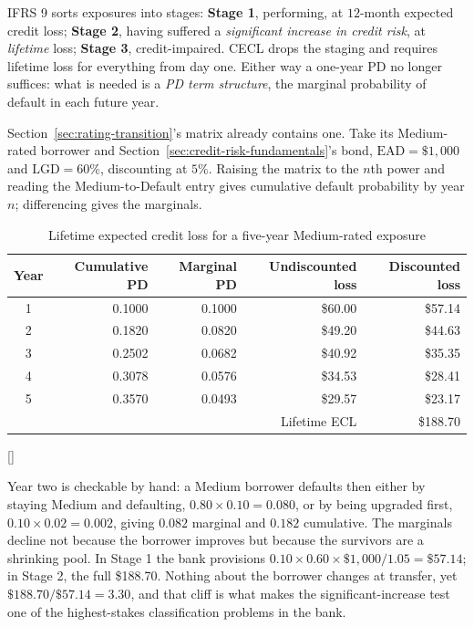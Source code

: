 \documentclass[../ai_in_finance]{subfiles}
\begin{document}
IFRS 9 sorts exposures into stages: \textbf{Stage 1}, performing, at $12$-month expected credit loss; \textbf{Stage 2}, having suffered a \emph{significant increase in credit risk}, at \emph{lifetime} loss; \textbf{Stage 3}, credit-impaired. CECL drops the staging and requires lifetime loss for everything from day one. Either way a one-year PD no longer suffices: what is needed is a \emph{PD term structure}, the marginal probability of default in each future year.

Section~\ref{sec:rating-transition}'s matrix already contains one. Take its Medium-rated borrower and Section~\ref{sec:credit-risk-fundamentals}'s bond, $\text{EAD}=\$1{,}000$ and $\text{LGD}=60\%$, discounting at $5\%$. Raising the matrix to the $n$th power and reading the Medium-to-Default entry gives cumulative default probability by year $n$; differencing gives the marginals.

\begin{table}[htbp]
\centering
\begin{lrbox}{\bookmeasuredbox}
\begin{tabular}{crrrr}
\toprule
Year & Cumulative PD & Marginal PD & Undiscounted loss & Discounted loss \\
\midrule
1 & 0.1000 & 0.1000 & \$60.00 & \$57.14 \\
2 & 0.1820 & 0.0820 & \$49.20 & \$44.63 \\
3 & 0.2502 & 0.0682 & \$40.92 & \$35.35 \\
4 & 0.3078 & 0.0576 & \$34.53 & \$28.41 \\
5 & 0.3570 & 0.0493 & \$29.57 & \$23.17 \\
\midrule
\multicolumn{4}{r}{Lifetime ECL} & \$188.70 \\
\bottomrule
\end{tabular}
\end{lrbox}
\ifdim\wd\bookmeasuredbox<0.65\linewidth
\setlength{\bookcapwidth}{0.65\linewidth}
\else
\setlength{\bookcapwidth}{\wd\bookmeasuredbox}
\fi
{}[\bookcapwidth]{
\usebox{\bookmeasuredbox}
}{
\caption{Lifetime expected credit loss for a five-year Medium-rated exposure}
\label{tab:lifetime_ecl}
}
\end{table}

Year two is checkable by hand: a Medium borrower defaults then either by staying Medium and defaulting, $0.80\times0.10=0.080$, or by being upgraded first, $0.10\times0.02=0.002$, giving $0.082$ marginal and $0.182$ cumulative. The marginals decline not because the borrower improves but because the survivors are a shrinking pool. In Stage 1 the bank provisions $0.10\times0.60\times\$1{,}000/1.05 = \$57.14$; in Stage 2, the full \$188.70. Nothing about the borrower changes at transfer, yet $\$188.70/\$57.14 = 3.30$, and that cliff is what makes the significant-increase test one of the highest-stakes classification problems in the bank.
\end{document}
